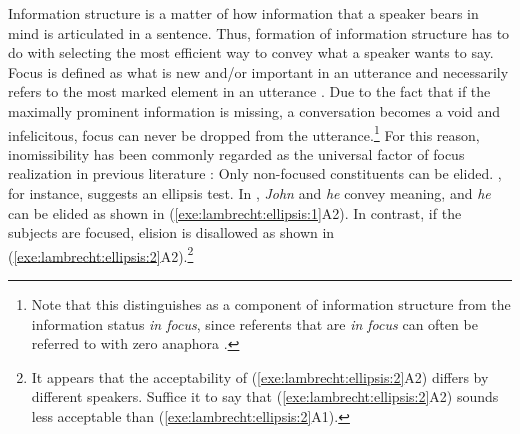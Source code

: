 \noindent Information structure is a matter of how information that a
speaker bears in mind is articulated in a sentence.
Thus, formation of information structure has to do with selecting the
most efficient way to convey what a speaker wants to say.  Focus is
defined as what is new and/or important in an utterance and
necessarily refers to the most marked element in an utterance
\citep{gundel:99,buring:10}.  Due to the fact that if the maximally
prominent information is missing, a conversation becomes a void and
infelicitous, focus can never be dropped from the
utterance.\footnote{Note that this distinguishes  as a
  component of information structure from the information status
  \textit{in focus}, since referents that are \textit{in focus} can
  often be referred to with zero anaphora \citep{gundel:03}.}  For
this reason, inomissibility has been commonly regarded as the
universal factor of focus realization in previous literature
\citep{lambrecht:96,rebuschi:tuller:99}: Only non-focused constituents
can be elided.  \citeauthor{lambrecht:96}, for instance, suggests an
ellipsis test. In , \textit{John} and
\textit{he} convey  meaning, and \textit{he} can be elided
as shown in (\ref{exe:lambrecht:ellipsis:1}A2). In contrast, if the
subjects are focused, elision is disallowed as shown in
(\ref{exe:lambrecht:ellipsis:2}A2).\footnote{It appears that the
  acceptability of (\ref{exe:lambrecht:ellipsis:2}A2) differs by
  different speakers. Suffice it to say that
  (\ref{exe:lambrecht:ellipsis:2}A2) sounds less acceptable than
  (\ref{exe:lambrecht:ellipsis:2}A1).}






